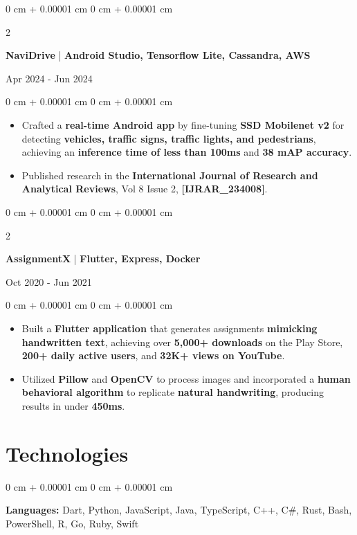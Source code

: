 \documentclass[10pt, letterpaper]{article}
\newenvironment{highlights}{
    \begin{itemize}[
        topsep=0.10 cm,
        parsep=0.10 cm,
        partopsep=0pt,
        itemsep=0pt,
        leftmargin=0 cm + 10pt
    ]
}{
    \end{itemize}
} %
\newenvironment{onecolentry}{
    \begin{adjustwidth}{
        0 cm + 0.00001 cm
    }{
        0 cm + 0.00001 cm
    }
}{
    \end{adjustwidth}
} %
\newenvironment{twocolentry}[2][]{
    \onecolentry
    \def\secondColumn{#2}
    \setcolumnwidth{\fill, 4.5 cm}
    \begin{paracol}{2}
}{
    \switchcolumn \raggedleft \secondColumn
    \end{paracol}
    \endonecolentry
} %
\begin{document}
        \begin{twocolentry}{
            Apr 2024 - Jun 2024
        }
            \textbf{NaviDrive} | \textbf{Android Studio, Tensorflow Lite, Cassandra, AWS}
        \end{twocolentry}
        \begin{onecolentry}
            \begin{highlights}
                \item Crafted a \textbf{real-time Android app} by fine-tuning \textbf{SSD Mobilenet v2} for detecting \textbf{vehicles, traffic signs, traffic lights, and pedestrians}, achieving an \textbf{inference time of less than 100ms} and \textbf{38 mAP accuracy}.
                \item Published research in the \textbf{International Journal of Research and Analytical Reviews}, Vol 8 Issue 2, \textbf{[IJRAR\_234008]}.
            \end{highlights}
        \end{onecolentry}
        
        \begin{twocolentry}{
            Oct 2020 - Jun 2021
        }
            \textbf{AssignmentX} | \textbf{Flutter, Express, Docker}
        \end{twocolentry}
        \begin{onecolentry}
            \begin{highlights}
                \item Built a \textbf{Flutter application} that generates assignments \textbf{mimicking handwritten text}, achieving over \textbf{5,000+ downloads} on the Play Store, \textbf{200+ daily active users}, and \textbf{32K+ views on YouTube}.
                \item Utilized \textbf{Pillow} and \textbf{OpenCV} to process images and incorporated a \textbf{human behavioral algorithm} to replicate \textbf{natural handwriting}, producing results in under \textbf{450ms}.
            \end{highlights}
        \end{onecolentry}
                

    
        \section{Technologies}

        \begin{onecolentry}
            \textbf{Languages:} Dart, Python, JavaScript, Java, TypeScript, C++, C\#, Rust, Bash, PowerShell, R, Go, Ruby, Swift
        \end{onecolentry}
        
\end{document}
